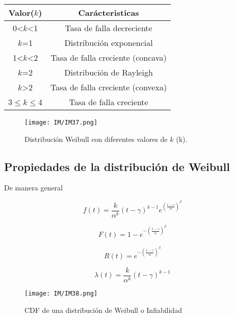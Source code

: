\documentclass[12pt,fleqn,a4paper,oneside]{LegrandOrangeBook}
\begin{document}
\begin{table}[H]
\begin{center}
\begin{tabular}{|c|c|}
\hline
\rowcolor[HTML]{EFEFEF} 
Valor($k$)    & Carácteristicas                   \\ \hline
0<$k$<1       & Tasa de falla decreciente         \\ \hline
$k$=1         & Distribución exponencial          \\ \hline
1<$k$<2       & Tasa de falla creciente (concava) \\ \hline
$k$=2         & Distribución de Rayleigh          \\ \hline
$k$>2         & Tasa de falla creciente (convexa) \\ \hline
3$\leq k\leq$4 & Tasa de falla creciente           \\ \hline
\end{tabular}
\end{center}
\end{table}
\begin{figure}[H]
\centering
\texttt{[image: IM/IM37.png]}
\caption{Distribución Weibull con diferentes valores de $k$ (k).}
\end{figure}
\subsection*{Propiedades de la distribución de Weibull}
De manera general
\begin{corollary}[Distribución]
\begin{equation}
f(t)=\frac{k}{\alpha^k}(t-\gamma)^{k-1}e^{\left(\frac{t-\gamma}{\alpha}\right)^{\beta}}
\end{equation}
\end{corollary}
\begin{corollary}[Infiabilidad]
\begin{equation}
F(t)=1-e^{-\left(\frac{t-\gamma}{\alpha}\right)^{\beta}}
\end{equation}
\end{corollary}
\begin{corollary}[Confiabilidad]
\begin{equation}
R(t)=e^{-\left(\frac{t-\gamma}{\alpha}\right)^{\beta}}
\end{equation}
\end{corollary}
\begin{corollary}
\begin{equation}
\lambda (t)=\frac{k}{\alpha^k}(t-\gamma)^{k-1}
\end{equation}
\end{corollary}
\begin{figure}[H]
\centering
\texttt{[image: IM/IM38.png]}
\caption{CDF de una distribución de Weibull o Infiabilidad}
\end{figure}
\end{document}
